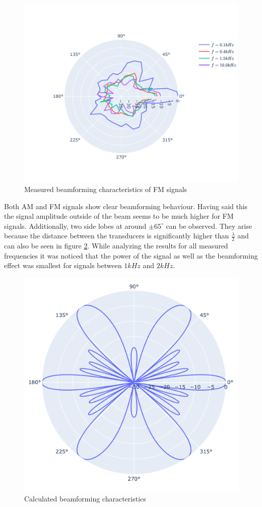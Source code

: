\begin{figure}
  \centering
  \includegraphics[height=\largeheight]{src/assets/pictures/measurements/beamforming_fm_polar.pdf}
  \caption{Measured beamforming characteristics of FM signals}\label{fig:meas:beam:polar_meas_fm}
\end{figure}
\p
Both AM and FM signals show clear beamforming behaviour. Having said this the signal amplitude outside of the beam seems to be much higher for FM signals. Additionally, two side lobes at around $\pm 65^\circ$ can be observed. They arise because the distance between the transducers is significantly higher than $\frac{\lambda}{2}$ and can also be seen in figure \ref{fig:meas:beam:polar_calc}. While analyzing the results for all measured frequencies it was noticed that the power of the signal as well as the beamforming effect was smallest for signals between $1kHz$ and $2kHz$.
%
\begin{figure}
  \centering
  \includegraphics[height=\mediumheight]{src/assets/pictures/measurements/beamforming_calc_polar.png}
  \caption{Calculated beamforming characteristics}\label{fig:meas:beam:polar_calc}
\end{figure}
